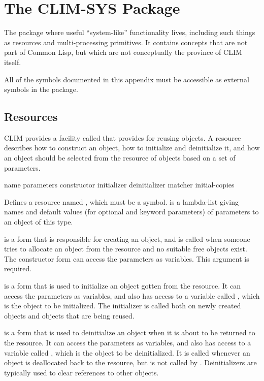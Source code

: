 
\chapter {The CLIM-SYS Package}
\label {clim-sys-package}

The  package where useful ``system-like'' functionality lives,
including such things as resources and multi-processing primitives.  It contains
concepts that are not part of Common Lisp, but which are not conceptually the
province of CLIM itself.

All of the symbols documented in this appendix must be accessible as external
symbols in the  package.


\section {Resources}

CLIM provides a facility called  that provides for reusing
objects.  A resource describes how to construct an object, how to initialize and
deinitialize it, and how an object should be selected from the resource of
objects based on a set of parameters.

 {name parameters
                         \key constructor initializer deinitializer
                              matcher initial-copies}

Defines a resource named , which must be a symbol.  
is a lambda-list giving names and default values (for optional and keyword
parameters) of parameters to an object of this type.

 is a form that is responsible for creating an object, and is
called when someone tries to allocate an object from the resource and no
suitable free objects exist.  The constructor form can access the parameters as
variables.  This argument is required.

 is a form that is used to initialize an object gotten from the
resource.  It can access the parameters as variables, and also has access to a
variable called , which is the object to be initialized.  The
initializer is called both on newly created objects and objects that are being
reused.

 is a form that is used to deinitialize an object when it is
about to be returned to the resource.  It can access the parameters as
variables, and also has access to a variable called , which is the
object to be deinitialized.  It is called whenever an object is deallocated back
to the resource, but is not called by .  Deinitializers are
typically used to clear references to other objects.

